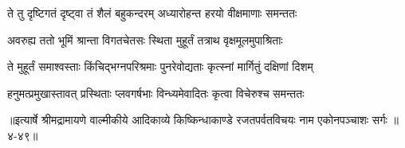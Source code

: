 \twolineshloka
{ते तु दृष्टिगतं दृष्ट्वा तं शैलं बहुकन्दरम्}
{अध्यारोहन्त हरयो वीक्षमाणाः समन्ततः} %

\twolineshloka
{अवरुह्य ततो भूमिं श्रान्ता विगतचेतसः}
{स्थिता मुहूर्तं तत्राथ वृक्षमूलमुपाश्रिताः} %

\twolineshloka
{ते मुहूर्तं समाश्वस्ताः किंचिद्भग्नपरिश्रमाः}
{पुनरेवोद्यताः कृत्स्नां मार्गितुं दक्षिणां दिशम्} %

\twolineshloka
{हनुमत्प्रमुखास्तावत् प्रस्थिताः प्लवगर्षभाः}
{विन्ध्यमेवादितः कृत्वा विचेरुश्च समन्ततः} %


॥इत्यार्षे श्रीमद्रामायणे वाल्मीकीये आदिकाव्ये किष्किन्धाकाण्डे रजतपर्वतविचयः नाम एकोनपञ्चाशः सर्गः ॥४-४९॥
